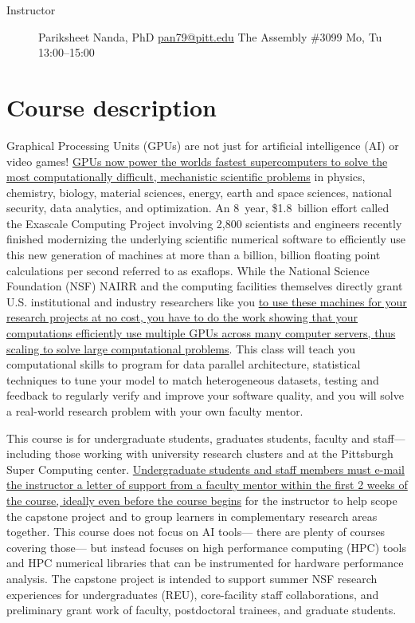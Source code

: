 \documentclass[12pt]{article}
\begin{document}


\begin{description}
\item[Instructor] Pariksheet Nanda, PhD \quad %
  \href{mailto:pan79@pitt.edu}{pan79@pitt.edu} \quad %
  The Assembly \#3099 \quad %
  Mo, Tu 13:00--15:00
\end{description}

\section{Course description}

Graphical Processing Units (GPUs) %
are not just for artificial intelligence (AI) or %
video games!
%
\ul{GPUs now power the worlds fastest supercomputers %
to solve the most computationally difficult, %
mechanistic scientific problems} in %
physics, %
chemistry, %
biology, %
material sciences, %
energy, %
earth and space sciences, %
national security, %
data analytics, and %
optimization.
%
An 8~year, \$1.8~billion effort %
called the Exascale Computing Project %
involving 2,800 scientists and engineers %
recently finished modernizing %
the underlying scientific numerical software %
to efficiently use this new generation of machines %
at more than a billion, billion floating point calculations per second %
referred to as exaflops.
%
While the National Science Foundation (NSF) NAIRR %
and the computing facilities themselves directly grant %
U.S. institutional and industry researchers like you %
\ul{to use these machines for your research projects at no cost, %
you have to do the work showing that %
your computations efficiently use %
multiple GPUs across many computer servers, %
thus scaling to solve large computational problems}.
%
This class will teach you %
computational skills to program for data parallel architecture, %
statistical techniques to tune your model to match heterogeneous datasets, %
testing and feedback %
to regularly verify and improve your software quality, %
and you will solve a real-world research problem with your own faculty mentor.

This course is for undergraduate students, %
graduates students, %
faculty and staff---%
including those working with university research clusters and %
at the Pittsburgh Super Computing center.
%
\ul{Undergraduate students and staff members %
must e-mail the instructor a letter of support from a faculty mentor %
within the first 2 weeks of the course, %
ideally even before the course begins} %
for the instructor to help scope the capstone project %
and to group learners in complementary research areas together.
%
This course does not focus on AI tools---%
there are plenty of courses covering those---%
but instead focuses on high performance computing (HPC) tools %
and HPC numerical libraries %
that can be instrumented for hardware performance analysis.
%
The capstone project is intended to support %
summer NSF research experiences for undergraduates (REU), %
core-facility staff collaborations, %
and preliminary grant work of %
faculty, postdoctoral trainees, and graduate students.
\end{document}

